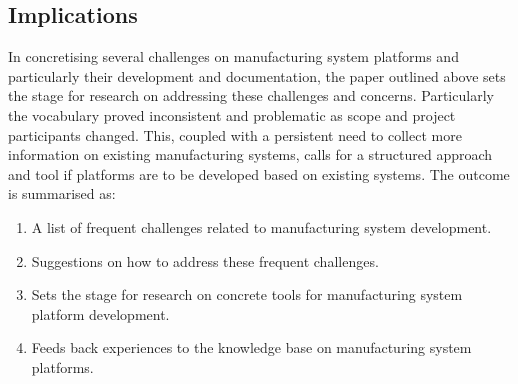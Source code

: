 \subsection{Implications}
In concretising several challenges on manufacturing system platforms and particularly their development and documentation, the paper outlined above sets the stage for research on addressing these challenges and concerns.
Particularly the vocabulary proved inconsistent and problematic as scope and project participants changed.
This, coupled with a persistent need to collect more information on existing manufacturing systems, calls for a structured approach and tool if platforms are to be developed based on existing systems.
The outcome is summarised as:
\begin{enumerate}
  \item A list of frequent challenges related to manufacturing system development.
  \item Suggestions on how to address these frequent challenges.
  \item Sets the stage for research on concrete tools for manufacturing system platform development.
  \item Feeds back experiences to the knowledge base on manufacturing system platforms.
\end{enumerate}